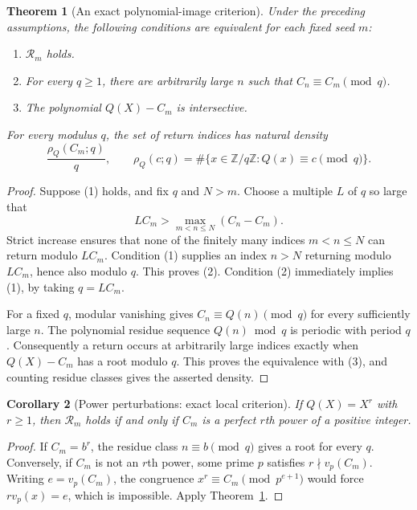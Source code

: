 \documentclass[11pt,a4paper]{article}
\newtheorem{theorem}{Theorem}[section]
\newtheorem{corollary}[theorem]{Corollary}
\theoremstyle{definition}
\theoremstyle{remark}
\numberwithin{equation}{section}
\begin{document}
\begin{theorem}[An exact polynomial-image criterion]
\label{tw:thm:exact-factorial-return}
Under the preceding assumptions, the following conditions are equivalent
for each fixed seed $m$:
\begin{enumerate}
\item $\mathcal R_m$ holds.
\item For every $q\ge1$, there are arbitrarily large $n$ such that
      $C_n\equiv C_m\pmod q$.
\item The polynomial $Q(X)-C_m$ is intersective.
\end{enumerate}
For every modulus $q$, the set of return indices has natural density
\[
 \frac{\rho_Q(C_m;q)}q,\qquad
 \rho_Q(c;q)=\#\{x\in\mathbb Z/q\mathbb Z:Q(x)\equiv c\pmod q\}.
\]
\end{theorem}
\begin{proof}
Suppose (1) holds, and fix $q$ and $N>m$.  Choose a multiple $L$ of $q$
so large that
\[
 LC_m>\max_{m<n\le N}(C_n-C_m).
\]
Strict increase ensures that none of the finitely many indices
$m<n\le N$ can return modulo $LC_m$.  Condition (1) supplies an index
$n>N$ returning modulo $LC_m$, hence also modulo $q$.  This proves (2).
Condition (2) immediately implies (1), by taking $q=LC_m$.

For a fixed $q$, modular vanishing gives
$C_n\equiv Q(n)\pmod q$ for every sufficiently large $n$.
The polynomial residue sequence $Q(n)\bmod q$ is periodic with period
$q$.  Consequently a return occurs at arbitrarily large indices exactly
when $Q(X)-C_m$ has a root modulo $q$.  This proves the equivalence with
(3), and counting residue classes gives the asserted density.
\end{proof}

\begin{corollary}[Power perturbations: exact local criterion]
\label{tw:cor:monomial-return-criterion}
If $Q(X)=X^r$ with $r\ge1$, then $\mathcal R_m$ holds if and only if
$C_m$ is a perfect $r$th power of a positive integer.
\end{corollary}
\begin{proof}
If $C_m=b^r$, the residue class $n\equiv b\pmod q$ gives a root for
every $q$.  Conversely, if $C_m$ is not an $r$th power, some prime $p$
satisfies $r\nmid v_p(C_m)$.  Writing $e=v_p(C_m)$, the congruence
$x^r\equiv C_m\pmod{p^{e+1}}$ would force
$rv_p(x)=e$, which is impossible.  Apply
Theorem~\ref{tw:thm:exact-factorial-return}.
\end{proof}
\end{document}
